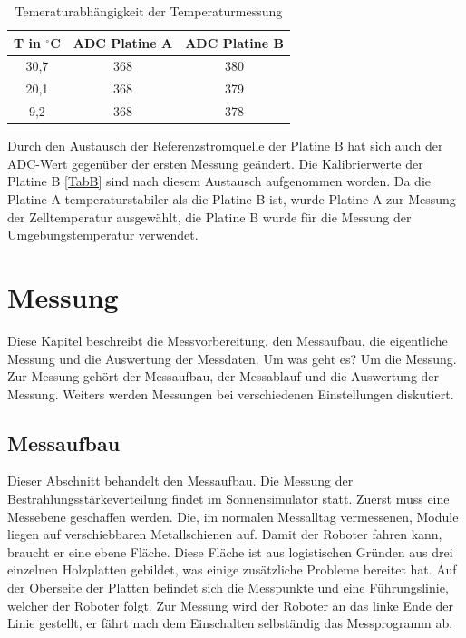 \documentclass[a4paper,bibtotoc,oneside]{scrbook}
\begin{document}
\begin{table}[htbp]
\centering
\begin{tabular}{ | c | c | c |}\hline
{\bf T in $^{\circ}$C} & {\bf ADC Platine A} & {\bf ADC Platine B}\\ \hline
\hline
30,7 & 368 & 380\\ \hline
20,1 & 368 & 379\\ \hline
9,2 & 368 & 378\\ \hline
\end{tabular}
\caption{Temeraturabhängigkeit der Temperaturmessung}\label{TabT2}
\end{table}

Durch den Austausch der Referenzstromquelle der Platine B hat sich auch der ADC-Wert gegenüber der ersten Messung geändert. Die Kalibrierwerte der Platine B \ref{TabB} sind nach diesem Austausch aufgenommen worden.
Da die Platine A temperaturstabiler als die Platine B ist, wurde Platine A zur Messung der Zelltemperatur ausgewählt, die Platine B wurde für die Messung der Umgebungstemperatur verwendet. 

\chapter{Messung}\thispagestyle{empty}

Diese Kapitel beschreibt die Messvorbereitung, den Messaufbau, die eigentliche Messung und die Auswertung der Messdaten. Um was geht es? Um die Messung. Zur Messung gehört der Messaufbau, der Messablauf und die Auswertung der Messung. Weiters werden Messungen bei verschiedenen Einstellungen diskutiert. 

\section{Messaufbau}\thispagestyle{empty}
Dieser Abschnitt behandelt den Messaufbau. Die Messung der Bestrahlungsstärkeverteilung findet im Sonnensimulator statt. Zuerst muss eine Messebene geschaffen werden. Die, im normalen Messalltag vermessenen, Module liegen auf verschiebbaren Metallschienen auf. Damit der Roboter fahren kann, braucht er eine ebene Fläche. Diese Fläche ist aus logistischen Gründen aus drei einzelnen Holzplatten gebildet, was einige zusätzliche Probleme bereitet hat. Auf der Oberseite der Platten befindet sich die Messpunkte und eine Führungslinie, welcher der Roboter folgt. Zur Messung wird der Roboter an das linke Ende der Linie gestellt, er fährt nach dem Einschalten selbständig das Messprogramm ab.
\end{document}
